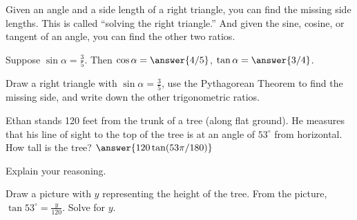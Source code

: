 \documentclass[nooutcomes]{ximera}
\begin{document}
Given an angle and a side length of a right triangle, you can find the missing side lengths.  This is called ``solving the right triangle.''    
And given the sine, cosine, or tangent of an angle, you can find the other two ratios. 

\begin{problem}
Suppose $\sin\alpha = \frac{3}{5}$.  Then $\cos\alpha = \answer{4/5}$, $\tan\alpha = \answer{3/4}$.  
\begin{hint}Draw a right triangle with $\sin\alpha = \frac{3}{5}$, use the Pythagorean Theorem to find the missing side, 
and write down the other trigonometric ratios.\end{hint}
\end{problem}

\begin{problem}
Ethan stands 120 feet from the trunk of a tree (along flat ground). He measures that his line of sight to the top of the tree is at an angle of $53^\circ$ from horizontal. How tall is the tree?  $\answer{120\tan(53\pi/180)}$

Explain your reasoning.
\begin{hint}Draw a picture with $y$ representing the height of the tree.  From the picture, $\tan 53^\circ = \frac{y}{120}$.  Solve for $y$. \end{hint}
\end{problem}

%
%
\end{document}

